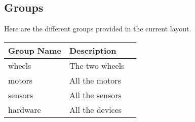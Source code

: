 \subsection{Groups}
Here are the different groups provided in the current layout.

\begin{tabular}{|l|l|l|}
  \hline
  Group Name & Description     \\
  \hline
  wheels     & The two wheels  \\
  motors     & All the motors  \\
  sensors    & All the sensors \\
  hardware   & All the devices \\
  \hline
\end{tabular}


